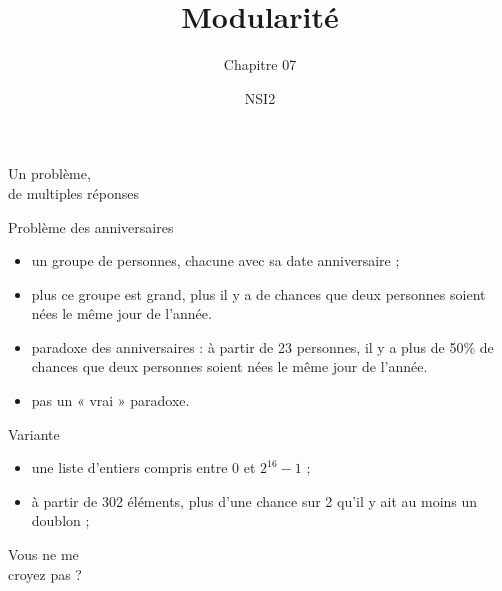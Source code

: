 \documentclass[12pt]{nsibeamer}
\title{Modularité}
\subtitle{Chapitre 07}
\author{NSI2}
\begin{document}
\maketitle

%

\begin{frame}[standout]
	\begin{center}
		\Huge
		Un problème,\\
		de multiples réponses
	\end{center}
\end{frame}

%

\begin{frame}{Problème des anniversaires}
\pause
\begin{itemize}
	\item un groupe de personnes, chacune avec sa date anniversaire ;\pause
	\item plus ce groupe est grand, plus il y a de chances que deux personnes soient nées le même jour de l'année.\pause
	\item  \alert{paradoxe des anniversaires} : \pause à partir de 23 personnes, il y a plus de 50\% de chances que deux personnes soient nées le même jour de l'année.\pause
	\item pas un « vrai » paradoxe.
\end{itemize}
\end{frame}

%

\begin{frame}{Variante}
\pause
\begin{itemize}
	\item une liste d'entiers compris entre $0$ et $2^{16}-1$ ;
	\item à partir de 302 éléments, plus d'une chance sur 2 qu'il y ait au moins un doublon ;
\end{itemize}
\end{frame}

%

\begin{frame}[standout]
	\begin{center}
		\Huge
		Vous ne me \\
		croyez pas ?
	\end{center}
\end{frame}

%
\end{document}
